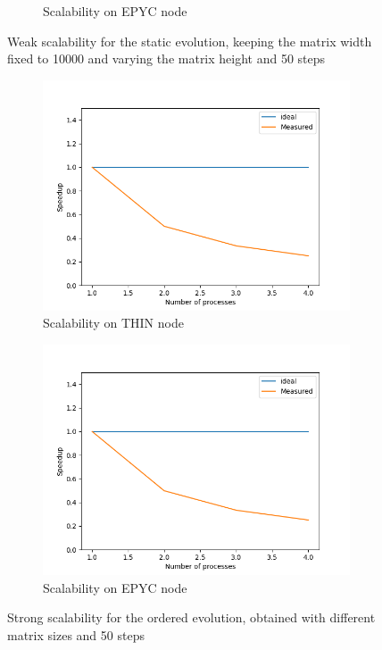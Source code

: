 \documentclass[12pt]{article}
\begin{document}
\begin{figure}[h]
\begin{subfigure}[b]{0.4\textwidth}
		\caption{Scalability on EPYC node}
		\label{fig:weak_epyc}
		\end{subfigure}
    \caption{Weak scalability for the static evolution, keeping the matrix width fixed to 10000 and varying the matrix height and 50 steps}
    \label{fig:weak_static}
    \end{figure}
    
    
      \begin{figure}[h]
    	\centering
    	\begin{subfigure}[b]{0.4\textwidth}
    		\includegraphics[width = \textwidth]{figs1/Weak_scal_THIN_ordered.png}
    		\caption{Scalability on THIN node}
    		\label{fig:weak_o_thin}
    	\end{subfigure}
    	\begin{subfigure}[b]{0.4\textwidth}
    		\includegraphics[width = \textwidth]{figs1/Weak_scal_EPYC_ordered.png}
    		\caption{Scalability on EPYC node}
    		\label{fig:weak_o_epyc}
    	\end{subfigure}
    	\caption{Strong scalability for the ordered evolution, obtained with different matrix sizes and 50 steps}
    	\label{fig:weak_ordered}
    \end{figure}
\end{document}
